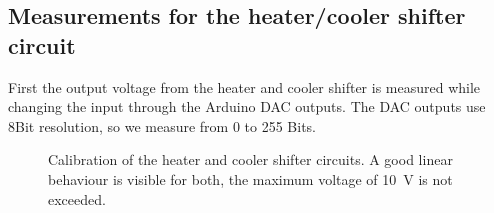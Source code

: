 \documentclass[12pt]{scrartcl}
\begin{document}
      \subsection{Measurements for the heater/cooler shifter circuit}
        First the output voltage from the heater and cooler shifter is measured while
        changing the input through the Arduino DAC outputs. The DAC outputs use
        8Bit resolution, so we measure from 0 to 255 Bits.
        \begin{figure}[h]
          \caption{Calibration of the heater and cooler shifter circuits. A good
          linear behaviour is visible for both, the maximum voltage of 10~V is
          not exceeded.}
          \label{fig8}
        \end{figure}
\end{document}
